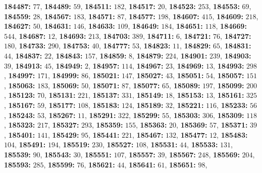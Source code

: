 \textsf{\bfseries 184487:} $77$, \textsf{\bfseries 184489:} $59$, \textsf{\bfseries 184511:} $182$, \textsf{\bfseries 184517:} $20$, \textsf{\bfseries 184523:} $253$, \textsf{\bfseries 184553:} $69$, \textsf{\bfseries 184559:} $28$, \textsf{\bfseries 184567:} $183$, \textsf{\bfseries 184571:} $87$, \textsf{\bfseries 184577:} $198$, \textsf{\bfseries 184607:} $415$, \textsf{\bfseries 184609:} $218$, \textsf{\bfseries 184627:} $50$, \textsf{\bfseries 184631:} $146$, \textsf{\bfseries 184633:} $109$, \textsf{\bfseries 184649:} $184$, \textsf{\bfseries 184651:} $118$, \textsf{\bfseries 184669:} $544$, \textsf{\bfseries 184687:} $12$, \textsf{\bfseries 184693:} $213$, \textsf{\bfseries 184703:} $389$, \textsf{\bfseries 184711:} $6$, \textsf{\bfseries 184721:} $76$, \textsf{\bfseries 184727:} $180$, \textsf{\bfseries 184733:} $290$, \textsf{\bfseries 184753:} $40$, \textsf{\bfseries 184777:} $53$, \textsf{\bfseries 184823:} $11$, \textsf{\bfseries 184829:} $65$, \textsf{\bfseries 184831:} $44$, \textsf{\bfseries 184837:} $22$, \textsf{\bfseries 184843:} $157$, \textsf{\bfseries 184859:} $8$, \textsf{\bfseries 184879:} $224$, \textsf{\bfseries 184901:} $239$, \textsf{\bfseries 184903:} $39$, \textsf{\bfseries 184913:} $45$, \textsf{\bfseries 184949:} $2$, \textsf{\bfseries 184957:} $114$, \textsf{\bfseries 184967:} $23$, \textsf{\bfseries 184969:} $13$, \textsf{\bfseries 184993:} $298$, \textsf{\bfseries 184997:} $171$, \textsf{\bfseries 184999:} $86$, \textsf{\bfseries 185021:} $147$, \textsf{\bfseries 185027:} $43$, \textsf{\bfseries 185051:} $54$, \textsf{\bfseries 185057:} $151$, \textsf{\bfseries 185063:} $183$, \textsf{\bfseries 185069:} $50$, \textsf{\bfseries 185071:} $87$, \textsf{\bfseries 185077:} $65$, \textsf{\bfseries 185089:} $197$, \textsf{\bfseries 185099:} $200$, \textsf{\bfseries 185123:} $70$, \textsf{\bfseries 185131:} $221$, \textsf{\bfseries 185137:} $331$, \textsf{\bfseries 185149:} $18$, \textsf{\bfseries 185153:} $13$, \textsf{\bfseries 185161:} $325$, \textsf{\bfseries 185167:} $59$, \textsf{\bfseries 185177:} $108$, \textsf{\bfseries 185183:} $124$, \textsf{\bfseries 185189:} $32$, \textsf{\bfseries 185221:} $116$, \textsf{\bfseries 185233:} $56$, \textsf{\bfseries 185243:} $53$, \textsf{\bfseries 185267:} $11$, \textsf{\bfseries 185291:} $322$, \textsf{\bfseries 185299:} $55$, \textsf{\bfseries 185303:} $306$, \textsf{\bfseries 185309:} $118$, \textsf{\bfseries 185323:} $217$, \textsf{\bfseries 185327:} $293$, \textsf{\bfseries 185359:} $155$, \textsf{\bfseries 185363:} $20$, \textsf{\bfseries 185369:} $57$, \textsf{\bfseries 185371:} $39$, \textsf{\bfseries 185401:} $141$, \textsf{\bfseries 185429:} $95$, \textsf{\bfseries 185441:} $221$, \textsf{\bfseries 185467:} $132$, \textsf{\bfseries 185477:} $12$, \textsf{\bfseries 185483:} $104$, \textsf{\bfseries 185491:} $194$, \textsf{\bfseries 185519:} $230$, \textsf{\bfseries 185527:} $108$, \textsf{\bfseries 185531:} $44$, \textsf{\bfseries 185533:} $131$, \textsf{\bfseries 185539:} $90$, \textsf{\bfseries 185543:} $30$, \textsf{\bfseries 185551:} $107$, \textsf{\bfseries 185557:} $39$, \textsf{\bfseries 185567:} $248$, \textsf{\bfseries 185569:} $204$, \textsf{\bfseries 185593:} $285$, \textsf{\bfseries 185599:} $76$, \textsf{\bfseries 185621:} $44$, \textsf{\bfseries 185641:} $61$, \textsf{\bfseries 185651:} $98$, 

